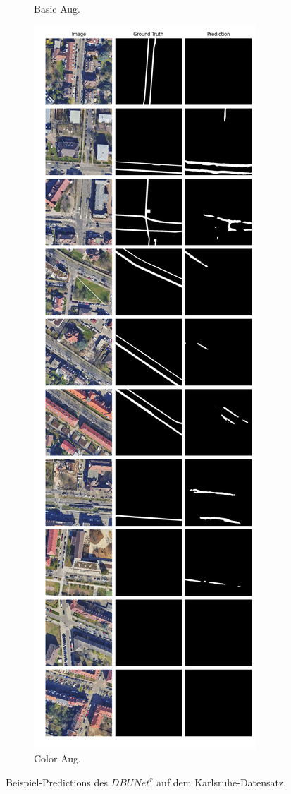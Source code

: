 \begin{figure}
\begin{subfigure}{.4\textwidth}
		\caption{Basic Aug.}
	\end{subfigure}
	\begin{subfigure}{.4\textwidth}
		\centering
		\includegraphics[width=1.\textwidth]{Bilder/karlsruhe-color-samples/dbunet-r.png}
		\caption{Color Aug.}
	\end{subfigure}
	\caption{Beispiel-Predictions des $DBUNet^r$ auf dem Karlsruhe-Datensatz.}
	\label{fig:ka-samples-dbunet-r}
	\end{figure}
	
